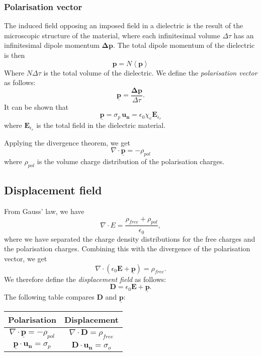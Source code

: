 \documentclass[a4paper, 12pt]{article}
\renewcommand{\vec}[1]{\mathbf{#1}}
\newcommand{\E}{\ensuremath{\vec{E}}}
\newcommand{\e}{\ensuremath{\epsilon_0}}
\newcommand{\p}{\ensuremath{\vec{\underline{p}}}}
\newcommand{\D}{\ensuremath{\vec{D}}}
\begin{document}
    \subsubsection{Polarisation vector}
        The induced field opposing an imposed field in a dielectric is the result of the microscopic structure of the material, 
        where each infinitesimal volume $\Delta \tau$ has an infinitesimal dipole momentum $\vec{\Delta p}$. 
        The total dipole momentum of the dielectric is then 
        \begin{equation}
            \vec{p} = N\left< \vec{p} \right>
        \end{equation}
        Where $N\Delta \tau$ is the total volume of the dielectric. We define the \textit{polarisation vector} as follows:
        \begin{equation}
            \p = \frac{\vec{\Delta p}}{\Delta \tau}.
        \end{equation}
        It can be shown that 
        \begin{equation}
            \p = \sigma_p\,\vec{u_n} = \e \chi_e \E_{\epsilon_r}
        \end{equation}
        where $\E_{\epsilon_r}$ is the total field in the dielectric material.
        
        Applying the divergence theorem, we get
        \begin{equation}
            \nabla \cdot \p = - \rho_{pol}
        \end{equation}
        where $\rho_{pol}$ is the volume charge distribution of the polarisation charges.

\subsection{Displacement field}
    From Gauss' law, we have 
    \begin{equation*}
        \nabla \cdot E = \frac{\rho_{free} + \rho_{pol}}{\e},
    \end{equation*}
    where we have separated the charge density distributions for the free charges and the polarisation charges. 
    Combining this with the divergence of the polarisation vector, we get 
    \begin{equation*}
        \nabla \cdot \left(\e\E + \p\right) = \rho_{free}.
    \end{equation*}
    We therefore define the \textit{displacement field} as follows:
    \begin{equation}
        \D = \e\E + \p.
    \end{equation}
    The following table compares $\D$ and $\p$:
    \begin{center}
        \begin{tabular}{ c|c } 
        Polarisation & Displacement \\
        \hline
         $\nabla \cdot \p = -\rho_{pol}$ & $\nabla \cdot \D = \rho_{free}$ \\[6px] 
         $\p \cdot \vec{u_n} = \sigma_p$ & $\D \cdot \vec{u_n} = \sigma_o$
        \end{tabular}
    \end{center}
\end{document}
